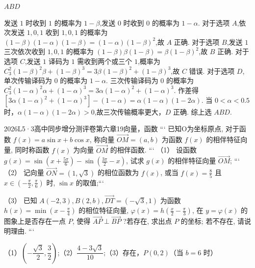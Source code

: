 \documentclass[12pt,UTF-8,a4paper]{ctexart}
\numberwithin{figure}{section}
\theoremstyle{mystyle}
\theoremstyle{mystylekaishu}
\theoremstyle{mystyle}
\numberwithin{xiti}{section}
\begin{document}
\begin{answer}
$ABD$
\end{answer}

\begin{solutions}
发送 $1$ 时收到 $1$ 的概率为 $1-\beta$,发送 $0$ 时收到 $0$ 的概率为 $1-\alpha$.
对于选项 $A$,依次发送 $1,0,1$ 收到 $1,0,1$ 的概率为 $(1-\beta)(1-\alpha)(1-\beta)=(1-\alpha)(1-\beta)^{2}$,故 $A$ 正确.
对于选项 $B$,发送 $1$ 三次依次收到 $1,0,1$ 的概率为 $(1-\beta)\beta(1-\beta)=\beta(1-\beta)^{2}$,故 $B$ 正确.
对于选项 $C$,发送 $1$ 译码为 $1$ 需收到两个或三个 $1$,概率为 $C_{3}^{2}(1-\beta)^{2}\beta+(1-\beta)^{3}=3\beta(1-\beta)^{2}+(1-\beta)^{3}$,故 $C$ 错误.
对于选项 $D$,单次传输译码为 $0$ 的概率为 $1-\alpha$. 三次传输译码为 $0$ 的概率为 $C_{3}^{2}(1-\alpha)^{2}\alpha+(1-\alpha)^{3}=3\alpha(1-\alpha)^{2}+(1-\alpha)^{3}$.
作差得 $[3\alpha(1-\alpha)^{2}+(1-\alpha)^{3}]-(1-\alpha)=\alpha(1-\alpha)(1-2\alpha)$.
当 $0<\alpha<0.5$ 时，$\alpha(1-\alpha)(1-2\alpha)>0$,故三次传输概率更大，$D$ 正确.
综上选 $ABD$.
\end{solutions}


\begin{problem}{2026}{L}{5·3高中同步增分测评卷第六章}{19}{向量，函数}
```
已知O为坐标原点, 对于函数 $f(x)=a \sin x+b \cos x$, 称向量 $\overrightarrow{O M}=(a, b)$ 为函数 $f(x)$ 的相伴特征向量, 同时称函数 $f(x)$ 为向量 $\overrightarrow{O M}$ 的相伴函数.
```
（1） 设函数 $g(x)=\sin \left(x+\frac{5 \pi}{6}\right)-\sin \left(\frac{3 \pi}{2}-x\right)$, 试求 $g(x)$ 的相伴特征向量 $\overrightarrow{O M}$;
```
（2） 记向量 $\overrightarrow{O N}=(1, \sqrt{3})$ 的相位函数为 $f(x)$, 或当 $f(x)=\frac{8}{5}$ 且 $x \in\left(-\frac{\pi}{2}, \frac{\pi}{6}\right)$ 时, $\sin x$ 的取值;```

（3） 已知 $A(-2,3), B(2, b), \overrightarrow{D T}=(-\sqrt{3}, 1)$ 为函数 $h(x)=\min \left(x-\frac{\pi}{4}\right)$ 的相位特征向量, $\varphi(x)=h\left(\frac{x}{2}-\frac{\pi}{3}\right)$, 在 $y=\varphi(x)$ 的图象上是否存在一点 $P$, 使得 $\overrightarrow{A P} \perp \overrightarrow{B P}$ ?若存在, 求出点 $P$ 的坐标; 若不存在, 请说明理由.
```
\end{problem}

\begin{answer}
（1）$\boxed{\left(-\dfrac{\sqrt{3}}{2}, \dfrac{3}{2}\right)}$;（2）$\boxed{\dfrac{4-3\sqrt{3}}{10}}$;（3）存在，$\boxed{P(0,2)}$（当 $b=6$ 时）
\end{answer}
\end{document}
